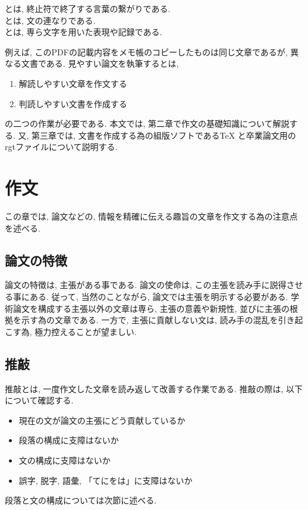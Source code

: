 \documentclass[12pt,xelatex,ja=standard]{bxjsarticle}
\begin{document}
\begin{Definition}
とは, 終止符で終了する言葉の繋がりである.\\
とは, 文の連なりである.\\
とは, 専ら文字を用いた表現や記録である.
\end{Definition}

例えば, このPDFの記載内容をメモ帳のコピーしたものは同じ文章であるが,
異なる文書である.
見やすい論文を執筆するとは,
\begin{enumerate}
\item 解読しやすい文章を作文する
\item 判読しやすい文書を作成する
\end{enumerate}
の二つの作業が必要である.
本文では,
第二章で作文の基礎知識について解説する.
又, 第三章では, 文書を作成する為の組版ソフトである\TeX
と卒業論文用のrgtファイルについて説明する.

\section{作文}
この章では,
論文などの, 情報を精確に伝える趣旨の文章を作文する為の注意点を述べる.

\subsection{論文の特徴}
論文の特徴は,
主張がある事である.
論文の使命は,
この主張を読み手に説得させる事にある.
従って, 当然のことながら,
論文では主張を明示する必要がある.
学術論文を構成する主張以外の文章は専ら,
主張の意義や新規性, 並びに主張の根拠を示す為の文章である.
一方で,
主張に貢献しない文は, 読み手の混乱を引き起こす為,
極力控えることが望ましい.

\subsection{推敲}
推敲とは,
一度作文した文章を読み返して改善する作業である.
推敲の際は, 以下について確認する.
\begin{itemize}
\item
現在の文が論文の主張にどう貢献しているか
\item
段落の構成に支障はないか
\item
文の構成に支障はないか
\item
誤字, 脱字, 語彙, 「てにをは」に支障はないか
\end{itemize}
段落と文の構成については次節に述べる.
\end{document}
